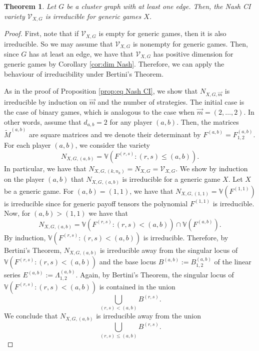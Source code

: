 \documentclass[11pt]{amsart}
\numberwithin{equation}{section}
\theoremstyle{plain}
\newtheorem{theorem}{Theorem}
\numberwithin{theorem}{section}
\theoremstyle{definition}
\begin{document}
\begin{theorem}
    \label{theo: irreducibility}
    Let $G$ be a cluster graph with at least one edge. Then, the Nash CI variety $\mathcal{V}_{X,G}$ is irreducible for generic games $X$.
\end{theorem}
\begin{proof}
    First, note that if $\mathcal{V}_{X,G}$ is empty for generic games, then it is also irreducible. So we may assume that  $\mathcal{V}_{X,G}$ is nonempty for generic games. Then, since $G$ has at least an edge, we have that $\mathcal{V}_{X,G}$ has positive dimension for generic games by Corollary \ref{cor:dim Nash}. Therefore, we can apply the behaviour of irreducibility under Bertini's Theorem.

    
   As in the proof of Proposition \ref{prop:eq Nash CI}, we show that $N_{X,G,\overrightarrow{m}}$ is irreducible  by induction on $\overrightarrow{m}$ and the number of strategies.
   The initial case is the case of binary games, which is analogous to the case when $\overrightarrow{m}=(2,\ldots,2)$. In other words, assume that $d_{a,b}=2$ for any player $(a,b)$. Then, the matrices $\widetilde{M}^{(a,b)}$ are square matrices and we denote their determinant by $F^{(a,b)}=F_{1,2}^{(a,b)}$.
   For each player $(a,b)$, we consider the variety 
   \[
   N_{X,G,(a,b)}=\mathbb{V}(F^{(r,s)}:(r,s)\leq (a,b)).
   \]
   In particular, we have that $N_{X,G,(k,n_k)}=N_{X,G}=\mathcal{V}_{X,G}$. We show by induction on the player $(a,b)$ that $ N_{X,G,(a,b)}$ is irreducible for a generic game $X$. Let $X$ be a generic game.
   For $(a,b)=(1,1)$, we have that $N_{X,G,(1,1)}=\mathbb{V}(F^{(1,1)})$ is irreducible  since for generic payoff tensors the polynomial $F^{(1,1)}$ is irreducible. Now, for $(a,b)>(1,1)$ we have that 
   \[
    N_{X,G,(a,b)}= \mathbb{V}(F^{(r,s)}:(r,s)<(a,b))\cap\mathbb{V}(F^{(a,b)}).
   \]
   By induction, $\mathbb{V}(F^{(r,s)}:(r,s)<(a,b))$ is irreducible. Therefore,
    by Bertini's Theorem, $N_{X,G,(a,b)}$ is irreducible away from the singular locus of $ \mathbb{V}(F^{(r,s)}:(r,s)<(a,b))$ and the base locus $B^{(a,b)}:=B_{1,2}^{(a,b)}$ of the linear series  $E^{(a,b)}:=\Lambda_{1,2}^{(a,b)}$.  Again, by Bertini's Theorem, the singular locus of $ \mathbb{V}(F^{(r,s)}:(r,s)<(a,b))$ is contained in the union
    \[
    \bigcup_{(r,s)<(a,b)}B^{(r,s)}.
    \]
    We conclude that $N_{X,G,(a,b)}$ is irreducible away from the union
      \begin{equation}\label{eq:union irred}
    \bigcup_{(r,s)\leq(a,b)}B^{(r,s)}.
    \end{equation}

\end{proof}
\end{document}
